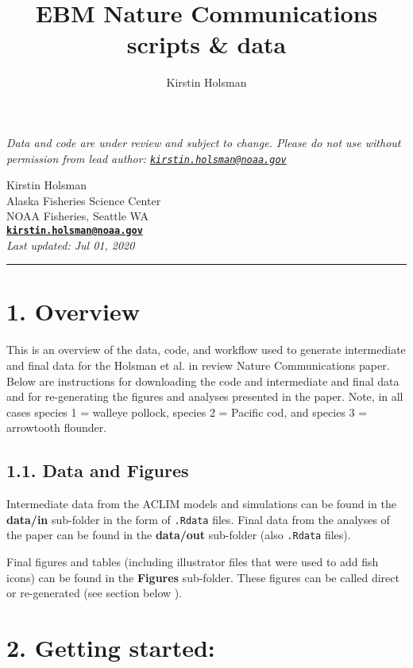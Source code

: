 \documentclass[]{article}
\title{EBM Nature Communications scripts \& data}
\author{Kirstin Holsman}
\date{}
\begin{document}
\maketitle

\emph{Data and code are under review and subject to change. Please do
not use without permission from lead author:
\href{mailto:kirstin.holsman@noaa.gov}{\nolinkurl{kirstin.holsman@noaa.gov}}}

Kirstin Holsman\\
Alaska Fisheries Science Center\\
NOAA Fisheries, Seattle WA\\
\textbf{\href{mailto:kirstin.holsman@noaa.gov}{\nolinkurl{kirstin.holsman@noaa.gov}}}\\
\emph{Last updated: Jul 01, 2020}

\begin{center}\rule{0.5\linewidth}{0.5pt}\end{center}

\section{1. Overview}\label{overview}

This is an overview of the data, code, and workflow used to generate
intermediate and final data for the Holsman et al. in review Nature
Communications paper. Below are instructions for downloading the code
and intermediate and final data and for re-generating the figures and
analyses presented in the paper. Note, in all cases species 1 = walleye
pollock, species 2 = Pacific cod, and species 3 = arrowtooth flounder.

\subsection{1.1. Data and Figures}\label{data-and-figures}

Intermediate data from the ACLIM models and simulations can be found in
the \textbf{data/in} sub-folder in the form of \texttt{.Rdata} files.
Final data from the analyses of the paper can be found in the
\textbf{data/out} sub-folder (also \texttt{.Rdata} files).

Final figures and tables (including illustrator files that were used to
add fish icons) can be found in the \textbf{Figures} sub-folder. These
figures can be called direct or re-generated (see section below ).

\section{2. Getting started:}\label{getting-started}
\end{document}

